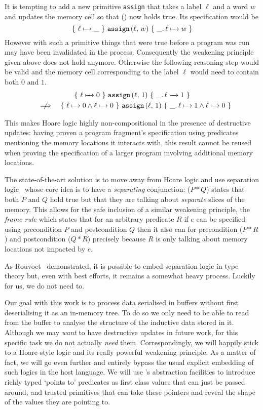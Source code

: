 It is tempting to add a new primitive \texttt{assign} that takes a
label $\ell$ and a word $w$ and updates the memory cell so that
() now holds true. Its specification would be
\[ \lbrace~ \ell \xmapsto{~~} \_ ~\rbrace~ \texttt{assign}\,(\ell,\,w) ~\lbrace~ \_.\, \ell \xmapsto{~~} w ~\rbrace \]
However with such a primitive things that were true before a program
was run may have been invalidated in the process.
%
Consequently the weakening principle given above does not hold anymore.
Otherwise the following reasoning step would be valid and the memory cell
corresponding to the label $\ell$ would need to contain both $0$ and $1$.
\begin{gather*}
  \Hoare{\Pointer{\ell}{}{0}}{\texttt{assign}\,(\ell,\,1)}{\_}{\Pointer{\ell}{}{1}}
  \\\quad \centernot\Longrightarrow \quad
   \Hoare{\Pointer{\ell}{}{0} \wedge \Pointer{\ell}{}{0}}{\texttt{assign}\,(\ell,\,1)}{\_}{\Pointer{\ell}{}{1} \wedge \Pointer{\ell}{}{0}}
\end{gather*}

This makes Hoare logic highly non-compositional in the presence of
destructive updates: having proven a program
fragment's specification using predicates mentioning the memory locations
it interacts with, this result cannot be reused when proving the specification
of a larger program involving additional memory locations.

The state-of-the-art solution is to move away from Hoare logic and use
separation logic~\citep{DBLP:conf/lics/Reynolds02,DBLP:journals/cacm/OHearn19,DBLP:books/hal/Chargueraud23,MANUAL:book/sfoundations/Chargueraud23}
whose core idea is to have a \emph{separating} conjunction: ($P \ast Q$)
states that both $P$ and $Q$ hold true but that they are talking about
\emph{separate} slices of the memory.
%
This allows for the safe inclusion of a similar weakening principle,
the \emph{frame rule} which states that for an arbitrary predicate $R$
if $e$ can be specified using precondition $P$ and postcondition $Q$
then it also can for precondition ($P \ast R$) and postcondition ($Q \ast R$)
precisely because $R$ is only talking about memory locations not impacted by $e$.

As Rouvoet~\citeyearpar{DBLP:phd/basesearch/Rouvoet21}
demonstrated, it is possible to embed separation logic in
type theory but, even with best efforts, it remains a somewhat
heavy process. Luckily for us, we do not need to.

Our goal with this work is to process data serialised in buffers
without first deserialising it as an in-memory tree.
To do so we only need to be able to read from the buffer to
analyse the structure of the inductive data stored in it.
%
Although we may \emph{want} to have destructive updates in future
work, for this specific task we do not actually \emph{need} them.
%
Correspondingly, we will happily stick to a Hoare-style logic and
its really powerful weakening principle.
%
As a matter of fact, we will go even further and entirely bypass the
usual explicit embedding of such logics in the host language.
%
We will use \idris{}'s abstraction facilities to introduce richly typed
`points to' predicates as first class values that can just be passed
around, and trusted primitives that can take these pointers and reveal
the shape of the values they are pointing to.
